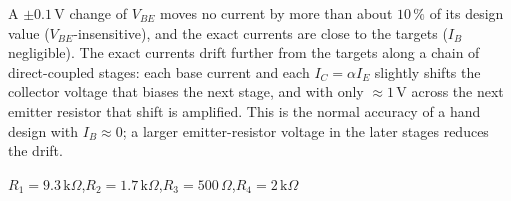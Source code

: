 \documentclass[11pt]{article}
\begin{document}
A $\pm0.1$\,V change of $V_{BE}$ moves no current by more than about $10\,\%$ of its design value ($V_{BE}$-insensitive), and the exact currents are close to the targets ($I_B$ negligible). The exact currents drift further from the targets along a chain of direct-coupled stages: each base current and each $I_C = \alpha I_E$ slightly shifts the collector voltage that biases the next stage, and with only $\approx1$\,V across the next emitter resistor that shift is amplified. This is the normal accuracy of a hand design with $I_B\approx0$; a larger emitter-resistor voltage in the later stages reduces the drift.
\begin{ansbox}
$R_{1} = 9.3\,\mathrm{k}\Omega$,\quad $R_{2} = 1.7\,\mathrm{k}\Omega$,\quad $R_{3} = 500\,\Omega$,\quad $R_{4} = 2\,\mathrm{k}\Omega$
\end{ansbox}

\newpage
\end{document}
